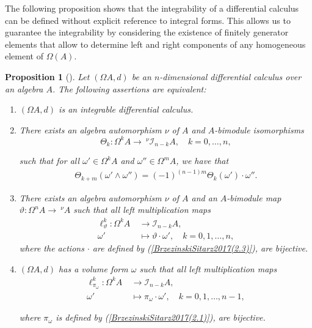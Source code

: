 \documentclass{amsart}
\newtheorem{proposition}[theorem]{Proposition}
\theoremstyle{definition}
\theoremstyle{remark}
\numberwithin{equation}{section}
\begin{document}
The following proposition shows that the integrability of a differential calculus can be defined without explicit reference to integral forms. This allows us to guarantee the integrability by considering the existence of finitely generator elements that allow to determine left and right components of any homogeneous element of $\Omega(A)$.

\begin{proposition}[{\cite[Theorem 2.2]{BrzezinskiSitarz2017}}]\label{integrableequiva} 
Let $(\Omega A, d)$ be an $n$-dimensional differential calculus over an algebra $A$. The following assertions are equivalent:
\begin{enumerate}
    \item [\rm (1)] $(\Omega A, d)$ is an integrable differential calculus.
    
    \item [\rm (2)] There exists an algebra automorphism $\nu$ of $A$ and $A$-bimodule isomorphisms 
    $$\Theta_k : \Omega^k A \rightarrow \ ^{\nu}\mathcal{I}_{n-k}A, \quad k =0, \ldots, n,
    $$
    
    such that for all $\omega'\in \Omega^k A$ and $\omega''\in \Omega^mA$, we have that 
    \begin{align*}
        \Theta_{k+m}(\omega'\wedge\omega'')=(-1)^{(n-1)m}\Theta_k(\omega')\cdot\omega''.
    \end{align*}
    
    \item [\rm (3)] There exists an algebra automorphism $\nu$ of $A$ and an $A$-bimodule map $\vartheta:\Omega^nA\rightarrow\ ^{\nu}A$ such that all left multiplication maps
    \begin{align*}
    \ell_{\vartheta}^{k}:\Omega^k A &\ \rightarrow \mathcal{I}_{n-k}A, \\
    \omega' &\ \mapsto \vartheta\cdot\omega', \quad k = 0, 1, \dotsc, n,
    \end{align*}
    where the actions $\cdot$ are defined by {\rm (}\ref{BrzezinskiSitarz2017(2.3)}{\rm )}, are bijective.
    
    \item [\rm (4)] $(\Omega A, d)$ has a volume form $\omega$ such that all left multiplication maps
    \begin{align*}
        \ell_{\pi_{\omega}}^{k}:\Omega^k A &\ \rightarrow \mathcal{I}_{n-k}A, \\
        \omega' &\ \mapsto \pi_{\omega} \cdot \omega', \quad k=0,1, \dotsc, n-1,
    \end{align*}
    
    where $\pi_{\omega}$ is defined by {\rm (}\ref{BrzezinskiSitarz2017(2.1)}{\rm )}, are bijective.
\end{enumerate}
\end{proposition}
\end{document}

